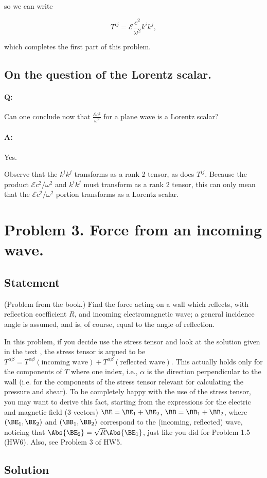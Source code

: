 so we can write

\begin{equation}\label{eqn:relElectroDynProblemSet6:190}
T^{i j} 
= \mathcal{E} \frac{c^2}{\omega^2} k^i k^j,
\end{equation}

which completes the first part of this problem.

\subsection{On the question of the Lorentz scalar.}

\paragraph{Q:} Can one conclude now that $\frac{\mathcal{E} c^2}{\omega^2}$ for a plane wave is a Lorentz scalar?
\paragraph{A:} Yes.

Observe that the $k^i k^j$ transforms as a rank 2 tensor, as does $T^{i j}$.  Because the product $\mathcal{E} c^2/\omega^2$ and $k^i k^j$ must transform as a rank 2 tensor, this can only mean that the $\mathcal{E} c^2/\omega^2$ portion transforms as a Lorentz scalar.

\section{Problem 3.  Force from an incoming wave.}
\subsection{Statement}

(Problem from the book.)  Find the force acting on a wall which reflects, with reflection coefficient $R$, and incoming electromagnetic wave; a general incidence angle is assumed, and is, of course, equal to the angle of reflection.

In this problem, if you decide use the stress tensor and look at the solution given in the text \cite{landau1980classical}, the stress tensor is argued to be  $T^{\alpha \beta} = T^{\alpha \beta}(\text{incoming wave}) + T^{\alpha \beta}(\text{reflected wave})$.  This actually holds only for the components of $T$ where one index, i.e., $\alpha$ is the direction perpendicular to the wall (i.e. for the components of the stress tensor relevant for calculating the pressure and shear). To be completely happy with the use of the stress tensor, you may want to derive this fact, starting from the expressions for the electric and magnetic field (3-vectors) $\BE = \BE_1 + \BE_2$, $\BB = \BB_1 + \BB_2$, where $(\BE_1, \BE_2)$ and $(\BB_1, \BB_2)$ correspond to the (incoming, reflected) wave, noticing that $\Abs{\BE_2} = \sqrt{R}\Abs{\BE_1}$, just like you did for Problem 1.5 (HW6).  Also, see Problem 3 of HW5.

\subsection{Solution}


\EndArticle
